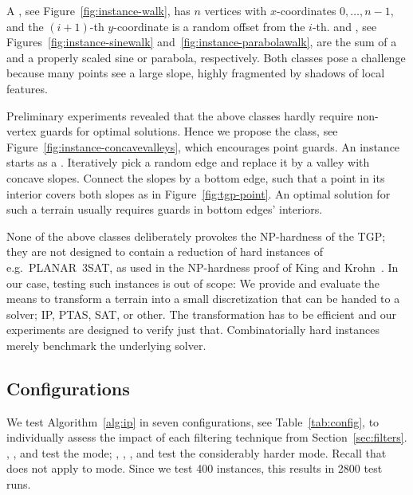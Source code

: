 A \walk, see Figure~\ref{fig:instance-walk}, has $n$ vertices with $x$-coordinates $0, \dots, n-1$, and the $(i+1)$-th $y$-coordinate is a random offset from the $i$-th.
\sinewalk and \parabolawalk, see Figures~\ref{fig:instance-sinewalk} and~\ref{fig:instance-parabolawalk}, are the sum of a \walk and a properly scaled sine or parabola, respectively.
Both classes pose a challenge because many points see a large slope, highly fragmented by shadows of local features.

Preliminary experiments revealed that the above classes hardly require non-vertex guards for optimal solutions.
Hence we propose the \concavevalleys class, see Figure~\ref{fig:instance-concavevalleys}, which encourages point guards.
An instance starts as a \walk.
Iteratively pick a random edge and replace it by a valley with concave slopes.
Connect the slopes by a bottom edge, such that a point in its interior covers both slopes as in Figure~\ref{fig:tgp-point}.
An optimal solution for such a terrain usually requires guards in bottom edges' interiors.

None of the above classes deliberately provokes the NP-hardness of the \ac{TGP};
they are not designed to contain a reduction of hard instances of e.g.\ {PLANAR~3SAT}, as used in the NP-hardness proof of King and Krohn~\cite{kk-tginph-11}.
In our case, testing such instances is out of scope:
We provide and evaluate the means to transform a terrain into a small discretization that can be handed to a solver; \ac{IP}, \ac{PTAS}, {SAT}, or other.
The transformation has to be efficient and our experiments are designed to verify just that.
Combinatorially hard instances merely benchmark the underlying solver.

\subsection{Configurations}
\label{sec:configurations}

We test Algorithm~\ref{alg:ip} in seven configurations, see Table~\ref{tab:config}, to individually assess the impact of each filtering technique from Section~\ref{sec:filters}.
\vdefault, \vnodom, and \vnow test the \vertexguardmode mode;
\pdefault, \pnoedge, \pnodom, and \pnow test the considerably harder \pointguardmode mode.
Recall that \pointguardfilter does not apply to \vertexguardmode mode.
Since we test 400 instances, this results in 2800 test runs.

